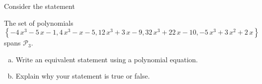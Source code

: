 
\begin{exerciseStatement}


Consider the statement 
\begin{center}\begin{minipage}{0.8\textwidth}
 The set of polynomials \( \left\{ -4 \, x^{3} - 5 \, x - 1 , 4 \, x^{3} - x - 5 , 12 \, x^{3} + 3 \, x - 9 , 32 \, x^{3} + 22 \, x - 10 , -5 \, x^{3} + 3 \, x^{2} + 2 \, x \right\} \) spans \(\mathcal{P}_3\). 
\end{minipage}\end{center}
    


\begin{enumerate}[(a)]
\item  Write an equivalent statement using a polynomial equation.
\item  Explain why your statement is true or false.
\end{enumerate}
    
\end{exerciseStatement}
    
